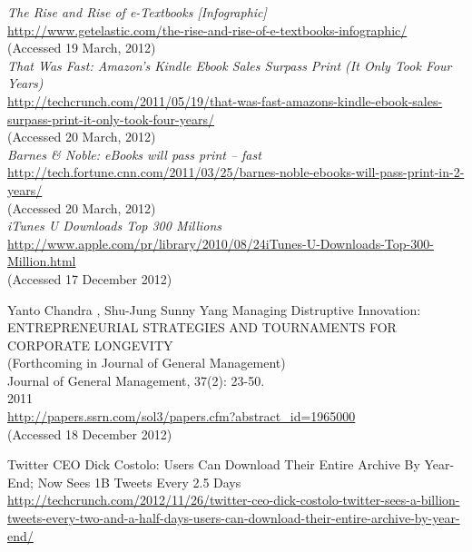 \documentclass[a4paper,10pt]{article}
\begin{document}
\begin{thebibliography}{9}
   \emph{The Rise and Rise of e-Textbooks [Infographic]}\\
   \url{http://www.getelastic.com/the-rise-and-rise-of-e-textbooks-infographic/}\\
  (Accessed 19 March, 2012)\\

  \emph{That Was Fast: Amazon's Kindle Ebook Sales Surpass Print (It Only Took Four Years)}\\
  \url{http://techcrunch.com/2011/05/19/that-was-fast-amazons-kindle-ebook-sales-surpass-print-it-only-took-four-years/}\\
  (Accessed 20 March, 2012)\\




  \emph{Barnes \& Noble: eBooks will pass print -- fast}\\
  \url{http://tech.fortune.cnn.com/2011/03/25/barnes-noble-ebooks-will-pass-print-in-2-years/}\\
  (Accessed 20 March, 2012)\\


  \emph{iTunes U Downloads Top 300 Millions}\\
  \url{http://www.apple.com/pr/library/2010/08/24iTunes-U-Downloads-Top-300-Million.html}\\
  (Accessed 17 December 2012)

Yanto Chandra , Shu-Jung Sunny Yang
Managing Distruptive Innovation: \\ 
ENTREPRENEURIAL STRATEGIES AND TOURNAMENTS FOR CORPORATE LONGEVITY\\
(Forthcoming in Journal of General Management) \\
Journal of General Management, 37(2): 23-50.\\
2011\\
\url{http://papers.ssrn.com/sol3/papers.cfm?abstract_id=1965000}\\
(Accessed 18 December 2012)

Twitter CEO Dick Costolo: Users Can Download Their Entire Archive By Year-End; Now Sees 1B Tweets Every 2.5 Days \\
\url{http://techcrunch.com/2012/11/26/twitter-ceo-dick-costolo-twitter-sees-a-billion-tweets-every-two-and-a-half-days-users-can-download-their-entire-archive-by-year-end/}\\


\end{thebibliography}
\end{document}
